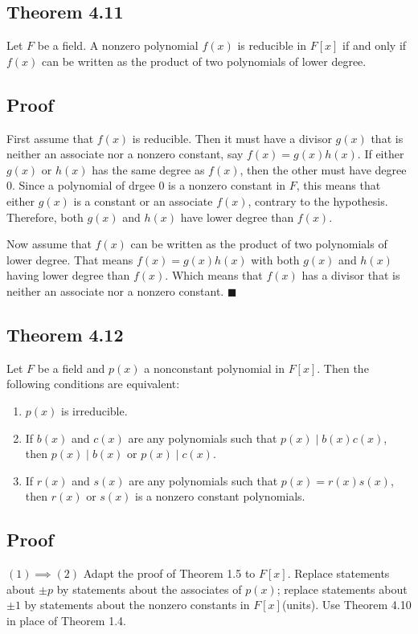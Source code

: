 \documentclass{article}
\begin{document}
\subsection*{Theorem 4.11}
Let $F$ be a field. A nonzero polynomial $f(x)$ is reducible in $F[x]$ if 
and only if $f(x)$ can be written as the product of two polynomials of lower degree.

\subsection*{Proof}
First assume that $f(x)$ is reducible. Then it must have a divisor $g(x)$
that is neither an associate nor a nonzero constant, say $f(x) = g(x)h(x)$.
If either $g(x)$ or $h(x)$ has the same degree as $f(x)$, then the other must have degree $0$.
Since a polynomial of drgee $0$ is a nonzero constant in $F$, this means 
that either $g(x)$ is a constant or an associate $f(x)$, contrary to the hypothesis.
Therefore, both $g(x)$ and $h(x)$ have lower degree than $f(x)$.

Now assume that $f(x)$ can be written as the product of two polynomials of lower degree.
That means $f(x) = g(x)h(x)$ with both $g(x)$ and $h(x)$ having lower degree than $f(x)$.
Which means that $f(x)$ has a divisor that is neither an associate nor a nonzero constant. $\blacksquare$

\subsection*{Theorem 4.12}
Let $F$ be a field and $p(x)$ a nonconstant polynomial in $F[x]$.
Then the following conditions are equivalent:
\begin{enumerate}
    \item $p(x)$ is irreducible.
    \item If $b(x)$ and $c(x)$ are any polynomials such that $p(x)\mid b(x)c(x)$, then
    $p(x)\mid b(x)$ or $p(x)\mid c(x)$.
    \item If $r(x)$ and $s(x)$ are any polynomials such that $p(x)=r(x)s(x)$, then $r(x)$ or $s(x)$ is a nonzero constant polynomials.
\end{enumerate}

\subsection*{Proof}
$(1) \implies (2)$ Adapt the proof of Theorem 1.5 to $F[x]$.
Replace statements about $\pm p$ by statements about the associates of $p(x)$;
replace statements about $\pm 1$ by statements about the nonzero constants in $F[x]$(units).
Use Theorem 4.10 in place of Theorem 1.4.
\end{document}

